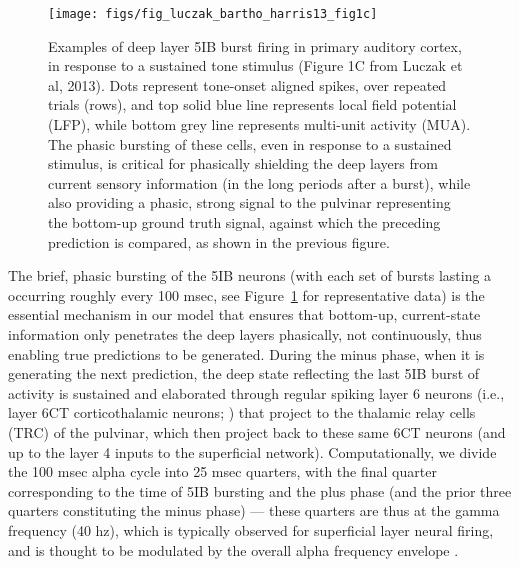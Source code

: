 \documentclass[11pt,twoside]{article}
\newif\myifpdf
\begin{document}
\begin{figure}
  \centering\texttt{[image: figs/fig\_luczak\_bartho\_harris13\_fig1c]}
  \caption{\footnotesize Examples of deep layer 5IB burst firing in primary auditory cortex, in response to a sustained tone stimulus (Figure 1C from Luczak et al, 2013).  Dots represent tone-onset aligned spikes, over repeated trials (rows), and top solid blue line represents local field potential (LFP), while bottom grey line represents multi-unit activity (MUA).  The phasic bursting of these cells, even in response to a sustained stimulus, is critical for phasically shielding the deep layers from current sensory information (in the long periods after a burst), while also providing a phasic, strong signal to the pulvinar representing the bottom-up ground truth signal, against which the preceding prediction is compared, as shown in the previous figure.}
  \label{fig.sound_disc_alpha}
\end{figure}

The brief, phasic bursting of the 5IB neurons (with each set of bursts lasting a occurring roughly every 100 msec, see Figure~\ref{fig.sound_disc_alpha} for representative data) is the essential mechanism in our model that ensures that bottom-up, current-state information only penetrates the deep layers phasically, not continuously, thus enabling true predictions to be generated.  During the minus phase, when it is generating the next prediction, the deep state reflecting the last 5IB burst of activity is sustained and elaborated through regular spiking layer 6 neurons (i.e., layer 6CT corticothalamic neurons; ) that project to the thalamic relay cells (TRC) of the pulvinar, which then project back to these same 6CT neurons (and up to the layer 4 inputs to the superficial network).  Computationally, we divide the 100 msec alpha cycle into 25 msec quarters, with the final quarter corresponding to the time of 5IB bursting and the plus phase (and the prior three quarters constituting the minus phase) --- these quarters are thus at the gamma frequency (40 hz), which is typically observed for superficial layer neural firing, and is thought to be modulated by the overall alpha frequency envelope \cite{DoughertyCoxNinomiyaEtAl17,vanKerkoerleSelfDagninoEtAl14,HaegensNacherLunaEtAl11,LakatosKarmosMehtaEtAl08,SpaakBonnefondMaierEtAl12,BollimuntaMoSchroederEtAl11,BollimuntaChenSchroederEtAl08}.
\end{document}
